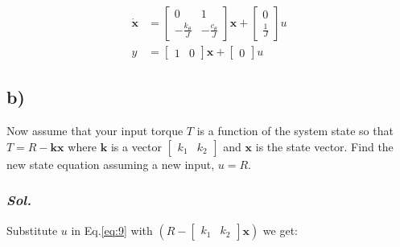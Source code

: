 \begin{equation} \label{eq:9}
    \begin{aligned} 
        \dot{\textbf{x}} &= 
        \begin{bmatrix}
            0 & 1 \\
            -\frac{k_{\theta}}{J} & -\frac{c_{\theta}}{J}
        \end{bmatrix}
        \textbf{x} + 
        \begin{bmatrix}
            0\\
            \frac{1}{J}
        \end{bmatrix}
        u
        \\
        y &=
        \begin{bmatrix}
            1 & 0
        \end{bmatrix}
        \textbf{x} + 
        \begin{bmatrix}
            0
        \end{bmatrix}
        u
    \end{aligned}
\end{equation}



\subsection{b)}
Now assume that your input torque $T$ is a function of the system state so that
$T = R - \textbf{k}\textbf{x}$ where $\textbf{k}$ is a vector $\begin{bmatrix}k_1 & k_2\end{bmatrix}$ and $\textbf{x}$ is the state vector. Find the new state equation assuming a new input, $u = R$.

\subsubsection{\textit{ Sol. }}

Substitute $u$ in Eq.\ref{eq:9} with 
$\left(R - \begin{bmatrix} k_1 & k_2 \end{bmatrix} \textbf{x}\right)$ we get:

